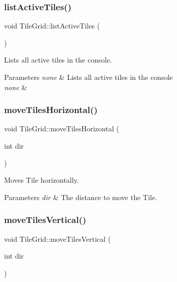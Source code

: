 \subsubsection{\texorpdfstring{list\+Active\+Tiles()}{listActiveTiles()}}
{\footnotesize\ttfamily void Tile\+Grid\+::list\+Active\+Tiles (\begin{DoxyParamCaption}{ }\end{DoxyParamCaption})}

Lists all active tiles in the console.


\begin{DoxyParams}{Parameters}
{\em none} & Lists all active tiles in the console\\
\hline
{\em none} & \\
\hline
\end{DoxyParams}
\mbox{\label{classTileGrid_ab9e350d439063b8286237b5b1c976590}} 
\subsubsection{\texorpdfstring{move\+Tiles\+Horizontal()}{moveTilesHorizontal()}}
{\footnotesize\ttfamily void Tile\+Grid\+::move\+Tiles\+Horizontal (\begin{DoxyParamCaption}\item[{int}]{dir }\end{DoxyParamCaption})}

Moves Tile horizontally.


\begin{DoxyParams}{Parameters}
{\em dir} & The distance to move the Tile. \\
\hline
\end{DoxyParams}
\mbox{\label{classTileGrid_a12cda2e17c1fa615d056aee8d523c708}} 
\subsubsection{\texorpdfstring{move\+Tiles\+Vertical()}{moveTilesVertical()}}
{\footnotesize\ttfamily void Tile\+Grid\+::move\+Tiles\+Vertical (\begin{DoxyParamCaption}\item[{int}]{dir }\end{DoxyParamCaption})}

